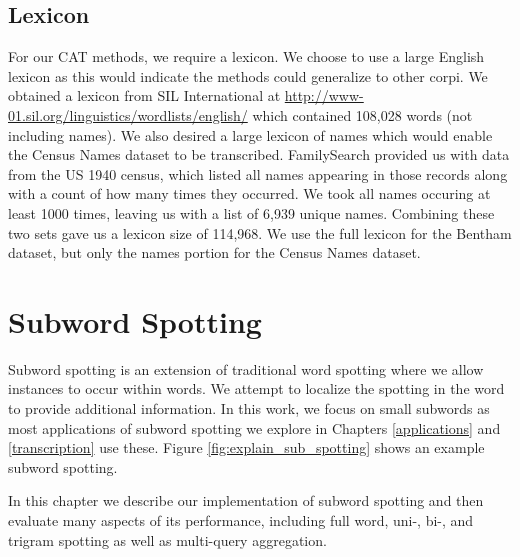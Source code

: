 \documentclass[ms,electronic,twosidetoc,letterpaper,chaptercenter,parttop,lol,lof,lot]{byumsphd}
\begin{document}
\section{Lexicon}

For our CAT methods, we require a lexicon. We choose to use a large English lexicon as this would indicate the methods could generalize to other corpi. We obtained a lexicon from SIL International at \url{http://www-01.sil.org/linguistics/wordlists/english/} which contained 108,028 words (not including names). We also desired a large lexicon of names which would enable the Census Names dataset to be transcribed. FamilySearch provided us with data from the US 1940 census, which listed all names appearing in those records along with a count of how many times they occurred. We took all names occuring at least 1000 times, leaving us with a list of 6,939 unique names. Combining these two sets gave us a lexicon size of 114,968. We use the full lexicon for the Bentham dataset, but only the names portion for the Census Names dataset.

\chapter{Subword Spotting}\label{subwordspotting}

Subword spotting is an extension of traditional word spotting where we allow instances to occur within words. We attempt to localize the spotting in the word to provide additional information. In this work, we focus on small subwords as most applications of subword spotting we explore in Chapters \ref{applications} and \ref{transcription} use these. Figure \ref{fig:explain_sub_spotting} shows an example subword spotting.

In this chapter we describe our implementation of subword spotting and then evaluate many aspects of its performance, including full word, uni-, bi-, and trigram spotting as well as multi-query aggregation.
\end{document}

